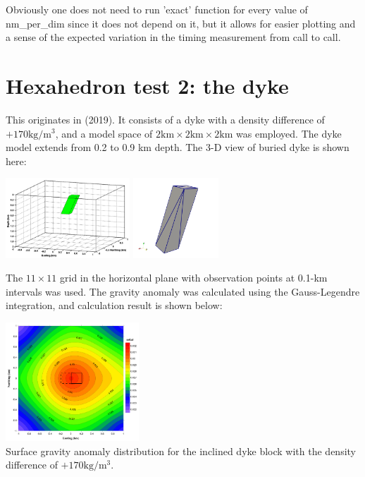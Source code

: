 Obviously one does not need to run 'exact' function for every value of {\python nm\_per\_dim}
since it does not depend on it, but it allows for easier plotting and a sense of the 
expected variation in the timing measurement from call to call. 


\section*{Hexahedron test 2: the dyke}

This originates in \textcite{uwms19} (2019). 
It consists of a dyke with a density difference 
of $+170 \si{\kg\per\cubic\meter}$, and a model space of 
$2\si{\km} \times  2 \si{\km} \times 2 \si{\km}$  was employed. 
The dyke model extends from 0.2 to 0.9 km depth. The 3-D view of buried dyke is shown here:

\begin{center}
\includegraphics[height=3cm]{python_codes/fieldstone_113/images/uwms19_a}
\includegraphics[height=3cm]{python_codes/fieldstone_113/images/dyke}
\end{center}

The $11 \times 11$ grid in the horizontal plane with observation
points at 0.1-km intervals was used. The gravity anomaly
was calculated using the Gauss-Legendre integration, and calculation result is shown below:

\begin{center}
\includegraphics[width=5cm]{python_codes/fieldstone_113/images/uwms19_b}\\
{\captionfont Surface gravity anomaly distribution for the inclined dyke
block with the density difference of $+170 \si{\kg\per\cubic\meter}$.}
\end{center}




